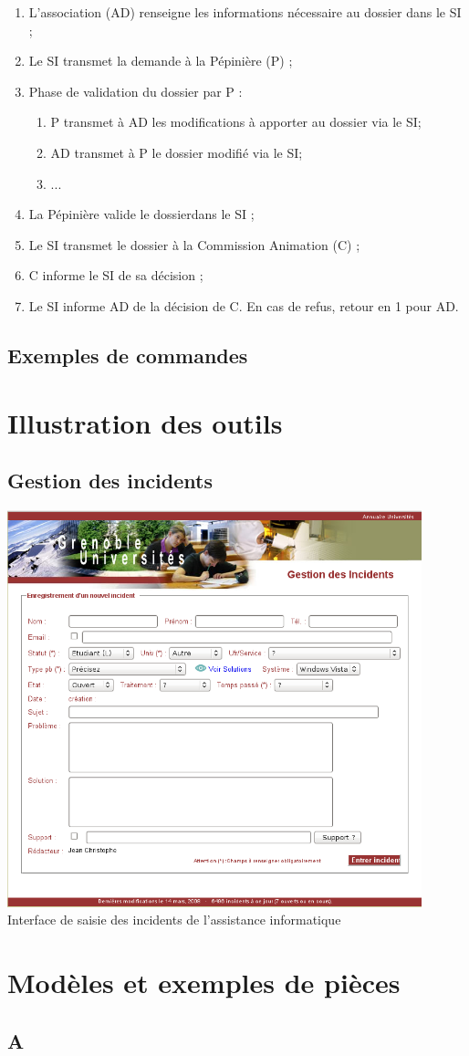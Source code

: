 \begin{enumerate}
\item L'association (AD) renseigne les informations nécessaire au dossier dans le SI ;
\item Le SI transmet la demande à la Pépinière (P) ;
\item Phase de validation du dossier par P : 
	\begin{enumerate}
	\item P transmet à AD les modifications à apporter au dossier via le SI;
	\item AD transmet à P le dossier modifié via le SI;
	\item ...
	\end{enumerate}
\item La Pépinière valide le dossierdans  le SI ; 
\item Le SI transmet le dossier à la Commission Animation (C) ;
\item C informe le SI de sa décision ;
\item Le SI informe AD de la décision de C. En cas de refus, retour en 1 pour AD.
\end{enumerate}



\subsection{Exemples de commandes}
\section{Illustration des outils}
\subsection{Gestion des incidents}
\label{gestion_incidents}
\begin{center}
	\includegraphics[width=12cm]{annexes/images/gestion_des_incidents.png} \\
	Interface de saisie des incidents de l'assistance informatique
\end{center}
\section{Modèles et exemples de pièces}
\subsection{A}

